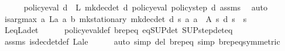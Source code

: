 \begin{isabellebody}
\ \ \ \ \isamarkupfalse%
\ {\isacartoucheopen}policy{\isacharunderscore}{\kern0pt}eval\ d\ {\isacharequal}{\kern0pt}\ L\ {\isacharparenleft}{\kern0pt}mk{\isacharunderscore}{\kern0pt}dec{\isacharunderscore}{\kern0pt}det\ d{\isacharparenright}{\kern0pt}\ {\isacharparenleft}{\kern0pt}policy{\isacharunderscore}{\kern0pt}eval\ {\isacharparenleft}{\kern0pt}policy{\isacharunderscore}{\kern0pt}step\ d{\isacharparenright}{\kern0pt}{\isacharparenright}{\kern0pt}{\isacartoucheclose}\ assms{\isacharparenleft}{\kern0pt}{}{\isacharparenright}{\kern0pt}\ \isamarkupfalse%
\ auto\isanewline
\ \ \isamarkupfalse%
\ {\isachardoublequoteopen}is{\isacharunderscore}{\kern0pt}arg{\isacharunderscore}{\kern0pt}max\ {\isacharparenleft}{\kern0pt}{\isasymlambda}a{\isachardot}{\kern0pt}\ L\isactrlsub a\ a\ {\isacharparenleft}{\kern0pt}{\isasymnu}\isactrlsub b\ {\isacharparenleft}{\kern0pt}mk{\isacharunderscore}{\kern0pt}stationary\ {\isacharparenleft}{\kern0pt}mk{\isacharunderscore}{\kern0pt}dec{\isacharunderscore}{\kern0pt}det\ d{\isacharparenright}{\kern0pt}{\isacharparenright}{\kern0pt}{\isacharparenright}{\kern0pt}\ s{\isacharparenright}{\kern0pt}\ {\isacharparenleft}{\kern0pt}{\isasymlambda}a{\isachardot}{\kern0pt}\ a\ {\isasymin}\ A\ s{\isacharparenright}{\kern0pt}\ {\isacharparenleft}{\kern0pt}d\ s{\isacharparenright}{\kern0pt}{\isachardoublequoteclose}\ \ s\isanewline
\ \ \ \ \isamarkupfalse%
\ L{\isacharunderscore}{\kern0pt}eq{\isacharunderscore}{\kern0pt}L\isactrlsub a{\isacharunderscore}{\kern0pt}det\isanewline
\ \ \ \ \isamarkupfalse%
\ policy{\isacharunderscore}{\kern0pt}eval{\isacharunderscore}{\kern0pt}def\ {\isasymL}\isactrlsub b{\isachardot}{\kern0pt}rep{\isacharunderscore}{\kern0pt}eq\ {\isasymL}{\isacharunderscore}{\kern0pt}eq{\isacharunderscore}{\kern0pt}SUP{\isacharunderscore}{\kern0pt}det\ SUP{\isacharunderscore}{\kern0pt}step{\isacharunderscore}{\kern0pt}det{\isacharunderscore}{\kern0pt}eq\isanewline
\ \ \ \ \isamarkupfalse%
\ assms{\isacharparenleft}{\kern0pt}{}{\isacharparenright}{\kern0pt}\ is{\isacharunderscore}{\kern0pt}dec{\isacharunderscore}{\kern0pt}det{\isacharunderscore}{\kern0pt}def\ L\isactrlsub a{\isacharunderscore}{\kern0pt}le\isanewline
\ \ \ \ \isamarkupfalse%
\ {\isacharparenleft}{\kern0pt}auto\ simp\ del{\isacharcolon}{\kern0pt}\ {\isasymnu}\isactrlsub b{\isachardot}{\kern0pt}rep{\isacharunderscore}{\kern0pt}eq\ simp{\isacharcolon}{\kern0pt}\ {\isasymnu}\isactrlsub b{\isachardot}{\kern0pt}rep{\isacharunderscore}{\kern0pt}eq{\isacharbrackleft}{\kern0pt}symmetric{\isacharbrackright}{\kern0pt}\ \isanewline

\end{isabellebody}

